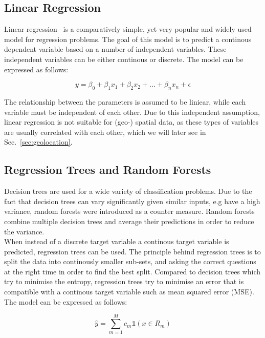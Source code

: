 
\subsection{Linear Regression}

Linear regression~\cite{montgomery2021introduction} is a comparatively simple, yet very popular and widely used model for regression problems. The goal of this model is to predict a continous dependent variable based on a number of independent variables. These independent variables can be either continous or discrete. The model can be expressed as follows:

\begin{equation}
    y = \beta_0 + \beta_1 x_1 + \beta_2 x_2 + ... + \beta_n x_n + \epsilon
\end{equation}

The relationship between the parameters is assumed to be liniear, while each variable must be independent of each other. Due to this independent assumption, linear regression is not suitable for (geo-) spatial data, as these types of variables are usually correlated with each other, which we will later see in Sec.~\ref{sec:geolocation}.

\subsection{Regression Trees and Random Forests}

Decision trees are used for a wide variety of classification problems. Due to the fact that decision trees can vary significantly given similar inputs, e.g have a high variance, random forests were introduced as a counter measure. Random forests combine multiple decision trees and average their predictions in order to reduce the variance.\\ 
When instead of a discrete target variable a continous target variable is predicted, regression trees can be used. The principle behind regression trees is to split the data into continously smaller sub-sets, and asking the correct questions at the right time in order to find the best split. Compared to decision trees which try to minimise the entropy, regression trees try to minimise an error that is compatible with a continous target variable such as mean squared error (MSE). The model can be expressed as follows:

\begin{equation}
    \hat{y} = \sum_{m=1}^M c_m \mathbb{1}(x \in R_m)
\end{equation}

